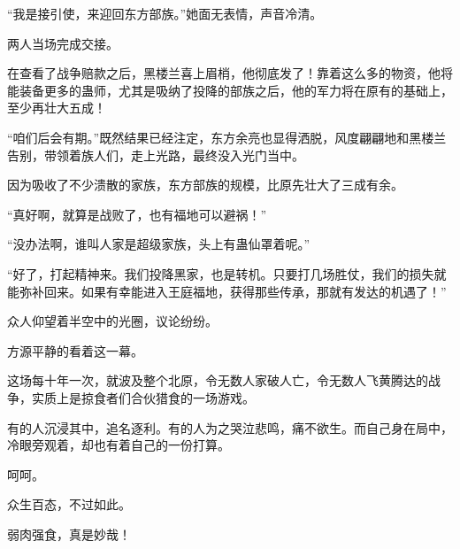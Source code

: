 \begin{this_body}
“我是接引使，来迎回东方部族。”她面无表情，声音冷清。

两人当场完成交接。

在查看了战争赔款之后，黑楼兰喜上眉梢，他彻底发了！靠着这么多的物资，他将能装备更多的蛊师，尤其是吸纳了投降的部族之后，他的军力将在原有的基础上，至少再壮大五成！

“咱们后会有期。”既然结果已经注定，东方余亮也显得洒脱，风度翩翩地和黑楼兰告别，带领着族人们，走上光路，最终没入光门当中。

因为吸收了不少溃散的家族，东方部族的规模，比原先壮大了三成有余。

“真好啊，就算是战败了，也有福地可以避祸！”

“没办法啊，谁叫人家是超级家族，头上有蛊仙罩着呢。”

“好了，打起精神来。我们投降黑家，也是转机。只要打几场胜仗，我们的损失就能弥补回来。如果有幸能进入王庭福地，获得那些传承，那就有发达的机遇了！”

众人仰望着半空中的光圈，议论纷纷。

方源平静的看着这一幕。

这场每十年一次，就波及整个北原，令无数人家破人亡，令无数人飞黄腾达的战争，实质上是掠食者们合伙猎食的一场游戏。

有的人沉浸其中，追名逐利。有的人为之哭泣悲鸣，痛不欲生。而自己身在局中，冷眼旁观着，却也有着自己的一份打算。

呵呵。

众生百态，不过如此。

弱肉强食，真是妙哉！

\end{this_body}

